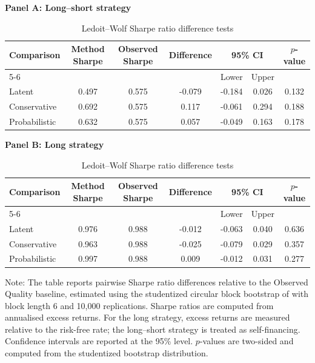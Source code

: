 \begin{table}[H]
\centering
\footnotesize
\renewcommand{\arraystretch}{1.12}
\setlength{\tabcolsep}{4pt}
\caption{Ledoit--Wolf Sharpe ratio difference tests}
\label{tab:main_methods_sharpe_difference_tests_ledoit_wolf}
\begin{threeparttable}
{\centering\textbf{Panel A: Long--short strategy}\par}
\vspace{0.4em}
\begin{tabular*}{\textwidth}{@{\extracolsep{\fill}}lcccccc}
\toprule
Comparison & Method Sharpe & Observed Sharpe & Difference & \multicolumn{2}{c}{95\% CI} & $p$-value \\
\cmidrule(lr){5-6}
& & & & Lower & Upper & \\
\midrule
Latent & 0.497 & 0.575 & -0.079 & -0.184 & 0.026 & 0.132 \\
Conservative & 0.692 & 0.575 & 0.117 & -0.061 & 0.294 & 0.188 \\
Probabilistic & 0.632 & 0.575 & 0.057 & -0.049 & 0.163 & 0.178 \\
\bottomrule
\end{tabular*}
\vspace{1em}
{\centering\textbf{Panel B: Long strategy}\par}
\vspace{0.4em}
\begin{tabular*}{\textwidth}{@{\extracolsep{\fill}}lcccccc}
\toprule
Comparison & Method Sharpe & Observed Sharpe & Difference & \multicolumn{2}{c}{95\% CI} & $p$-value \\
\cmidrule(lr){5-6}
& & & & Lower & Upper & \\
\midrule
Latent & 0.976 & 0.988 & -0.012 & -0.063 & 0.040 & 0.636 \\
Conservative & 0.963 & 0.988 & -0.025 & -0.079 & 0.029 & 0.357 \\
Probabilistic & 0.997 & 0.988 & 0.009 & -0.012 & 0.031 & 0.277 \\
\bottomrule
\end{tabular*}
\begin{tablenotes}[flushleft]
\scriptsize
\item Note: The table reports pairwise Sharpe ratio differences relative to the Observed Quality baseline, estimated using the studentized circular block bootstrap of \textcite{ledoit2008} with block length 6 and 10,000 replications. Sharpe ratios are computed from annualised excess returns. For the long strategy, excess returns are measured relative to the risk-free rate; the long--short strategy is treated as self-financing. Confidence intervals are reported at the 95\% level. $p$-values are two-sided and computed from the studentized bootstrap distribution.
\end{tablenotes}
\end{threeparttable}
\end{table}
